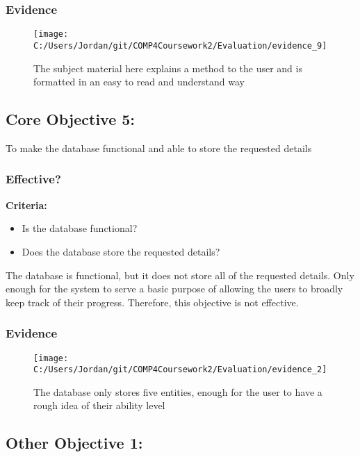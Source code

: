 \subsubsection{Evidence}

\begin{figure}[H]
	\texttt{[image: C:/Users/Jordan/git/COMP4Coursework2/Evaluation/evidence\_9]}
	\caption{The subject material here explains a method to the user and is formatted in an easy to read and understand way}
\end{figure}

\subsection{Core Objective 5: }

To make the database functional and able to store the requested details

\subsubsection{Effective?}

\textbf{Criteria: }

\begin{itemize}
	\item Is the database functional?
	\item Does the database store the requested details?
\end{itemize}

The database is functional, but it does not store all of the requested details. Only enough for the system to serve a basic purpose of allowing the users to broadly keep track of their progress. Therefore, this objective is not effective.

\subsubsection{Evidence}

\begin{figure}[H]
	\texttt{[image: C:/Users/Jordan/git/COMP4Coursework2/Evaluation/evidence\_2]}
	\caption{The database only stores five entities, enough for the user to have a rough idea of their ability level}
\end{figure}

\subsection{Other Objective 1: }

